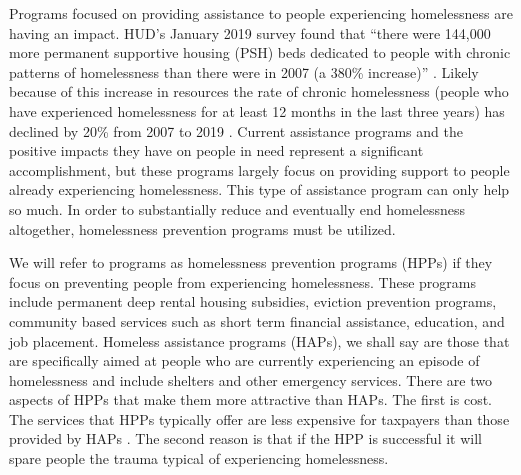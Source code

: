 \documentclass[12pt]{report}
\begin{document}
Programs focused on providing assistance to people experiencing homelessness are having an impact. HUD's January 2019 survey found that ``there were 144,000 more permanent supportive housing (PSH) beds dedicated to people with chronic patterns of homelessness than there were in 2007 (a 380\% increase)'' \cite{2019AHAR}. Likely because of this increase in resources the rate of chronic homelessness (people who have experienced homelessness for at least 12 months in the last three years) has declined by 20\% from 2007 to 2019 \cite{2019AHAR}. Current assistance programs and the positive impacts they have on people in need represent a significant accomplishment, but these programs largely focus on providing support to people already experiencing homelessness. This type of assistance program can only help so much. In order to substantially reduce and eventually end homelessness altogether, homelessness prevention programs must be utilized. 

We will refer to programs as homelessness prevention programs (HPPs) if they focus on preventing people from experiencing homelessness. These programs include permanent deep rental housing subsidies, eviction prevention programs, community based services such as short term financial assistance, education, and job placement. Homeless assistance programs (HAPs), we shall say are those that are specifically aimed at people who are currently experiencing an episode of homelessness and include shelters and other emergency services. There are two aspects of HPPs that make them more attractive than HAPs. The first is cost. The services that HPPs typically offer are less expensive for taxpayers than those provided by HAPs \cite{shinn2019homelessness}. The second reason is that if the HPP is successful it will spare people the trauma typical of experiencing homelessness.
\end{document}
